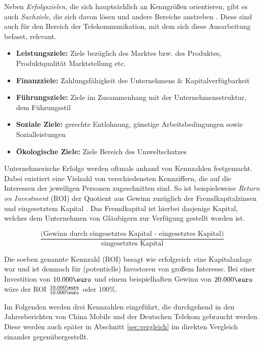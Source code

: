 Neben \textit{Erfolgszielen}, die sich hauptsächlich an Kenngrößen orientieren, gibt es auch \textit{Sachziele}, die sich davon lösen und andere Bereiche anstreben \cite{domschke}. Diese sind auch für den Bereich der Telekommunikation, mit dem sich diese Ausarbeitung befasst, relevant.

\label{unternehmensziele}
\begin{itemize}
\item \textbf{Leistungsziele:} Ziele bezüglich des Marktes bzw. des Produktes, Produktqualität Marktstellung etc.
\item \textbf{Finanzziele:} Zahlungsfähigkeit des Unternehmens \& Kapitalverfügbarkeit
\item \textbf{Führungsziele:} Ziele im Zusammenhang mit der Unternehmensstruktur, dem Führungsstil 
\item \textbf{Soziale Ziele:} gerechte Entlohnung, günstige Arbeitsbedingungen sowie Sozialleistungen
\item \textbf{Ökologische Ziele:} Ziele Bereich des Umweltschutzes
\end{itemize}

Unternehmerische Erfolge werden oftmals anhand von Kennzahlen festgemacht. Dabei existiert eine Vielzahl von verschiedensten Kennziffern, die auf die Interessen der jeweiligen Personen zugeschnitten sind. So ist beispielsweise \textit{Return on Investment} (ROI) der Quotient aus Gewinn zuzüglich der Fremdkapitalzinsen und eingesetztem Kapital \cite{domschke}. Das Fremdkapital ist hierbei dasjenige Kapital, welches dem Unternehmen von Gläubigern zur Verfügung gestellt worden ist.

\begin{equation}
\frac{\text{(Gewinn durch eingesetztes Kapital - eingesetztes Kapital)}}{\text{eingesetztes Kapital}}
\end{equation}

Die soeben genannte Kennzahl (ROI) besagt wie \glqq erfolgreich\grqq \ eine Kapitalanlage war und ist demnach für (potentielle) Investoren von großem Interesse. Bei einer Investition von $10.000\text{\euro}$ und einem beispielhaften Gewinn von $20.000\text{\euro}$ wäre der ROI $\frac{10.000\text{\euro}}{10.000\text{\euro}}$ oder $100\%$. 

Im Folgenden werden drei Kennzahlen eingeführt, die durchgehend in den Jahresberichten von China Mobile und der Deutschen Telekom gebraucht werden. Diese werden auch später in Abschnitt \ref{sec:vergleich} im direkten Vergleich einander gegenübergestellt.

